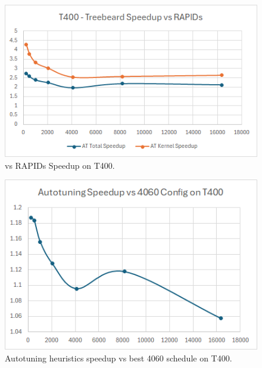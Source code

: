 \begin{figure}[htb]
  \centering
  \includegraphics[width=\linewidth]{figures/TBvsRAPIDs_AllBatchSizes_T400.png}
  \caption{\Treebeard{} vs RAPIDs Speedup on T400.}
  \label{Fig:TBvsRAPIDs_AllBatchSizes_T400}
\end{figure}

\begin{figure}[htb]
  \centering
  \includegraphics[width=\linewidth]{figures/AutotuningSpeedupvs4060Sched_T400.png}
  \caption{Autotuning heuristics speedup vs best 4060 schedule on T400.}
  \label{Fig:AutotuningSpeedupvs4060Sched_T400}
\end{figure}

